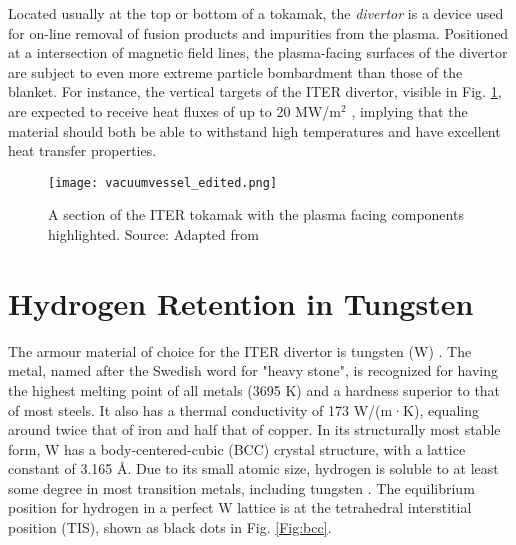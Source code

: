 Located usually at the top or bottom of a tokamak, the \textit{divertor} is a device used for on-line removal of fusion products and impurities from the plasma.
Positioned at a intersection of magnetic field lines, the plasma-facing surfaces of the divertor are subject to even more extreme particle bombardment than those of the blanket.
For instance, the vertical targets of the ITER divertor, visible in Fig. \ref{fig:ITERslice}, are expected to receive heat fluxes of up to 20 MW/m$^2$ \cite{Iter1234Divertor}, implying that the material should both be able to withstand high temperatures and have excellent heat transfer properties.

\vspace{35mm}
\begin{figure}[!ht]
\center
\texttt{[image: vacuumvessel\_edited.png]}
\caption{A section of the ITER tokamak with the plasma facing components highlighted. Source: Adapted from \cite{ITERCrossSection}}
\label{fig:ITERslice}
\end{figure}

\section{Hydrogen Retention in Tungsten}
The armour material of choice for the ITER divertor is tungsten (W) \cite{PITTS2013S48}.
The metal, named after the Swedish word for "heavy stone", is recognized for having the highest melting point of all metals (3695 K) and a hardness superior to that of most steels. 
It also has a thermal conductivity of 173 W/(m·K), equaling around twice that of iron and half that of copper. 
In its structurally most stable form, W has a body-centered-cubic (BCC) crystal structure, with a lattice constant of 3.165 \AA.
Due to its small atomic size, hydrogen is soluble to at least some degree in most transition metals, including tungsten \cite{smith1934occlusion, frauenfelder1969solution}.
The equilibrium position for hydrogen in a perfect W lattice is at the tetrahedral interstitial position (TIS), shown as black dots in Fig. \ref{Fig:bcc}. 

